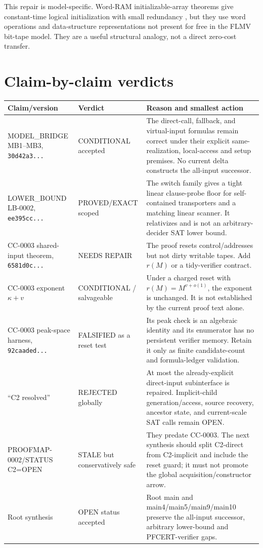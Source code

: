\documentclass[11pt]{article}
\begin{document}
This repair is model-specific.  Word-RAM initializable-array theorems give
constant-time logical initialization with small redundancy
\cite{hagerupkammer,katohgoto}, but they use word operations and data-structure
representations not present for free in the FLMV bit-tape model.  They are a
useful structural analogy, not a direct zero-cost transfer.

\section{Claim-by-claim verdicts}
\begin{longtable}{p{}p{}p{}}
\toprule Claim/version&Verdict&Reason and smallest action\\\midrule\endhead
MODEL\_BRIDGE MB1--MB3, \texttt{30d42a3...}
&CONDITIONAL accepted&The direct-call, fallback, and virtual-input formulas
remain correct under their explicit same-realization, local-access and setup
premises.  No current delta constructs the all-input successor.\\
LOWER\_BOUND LB-0002, \texttt{ee395cc...}
&PROVED/EXACT scoped&The switch family gives a tight linear clause-probe
floor for self-contained transporters and a matching linear scanner.  It
relativizes and is not an arbitrary-decider SAT lower bound.\\
CC-0003 shared-input theorem, \texttt{6581d0c...}
&NEEDS REPAIR&The proof resets control/addresses but not dirty writable
tapes.  Add $r(M)$ or a tidy-verifier contract.\\
CC-0003 exponent $\kappa+v$
&CONDITIONAL / salvageable&Under a charged reset with
$r(M)=M^{v+o(1)}$, the exponent is unchanged.  It is not established by the
current proof text alone.\\
CC-0003 peak-space harness, \texttt{92caaded...}
&FALSIFIED as a reset test&Its peak check is an algebraic identity and its
enumerator has no persistent verifier memory.  Retain it only as finite
candidate-count and formula-ledger validation.\\
``C2 resolved''
&REJECTED globally&At most the already-explicit direct-input subinterface is
repaired.  Implicit-child generation/access, source recovery, ancestor state,
and current-scale SAT calls remain OPEN.\\
PROOFMAP-0002/STATUS C2=OPEN
&STALE but conservatively safe&They predate CC-0003.  The next synthesis
should split C2-direct from C2-implicit and include the reset guard; it must
not promote the global acquisition/constructor arrow.\\
Root synthesis
&OPEN status accepted&Root main and main4/main5/main9/main10 preserve the
all-input successor, arbitrary lower-bound and PFCERT-verifier gaps.\\
\bottomrule
\end{longtable}
\end{document}
